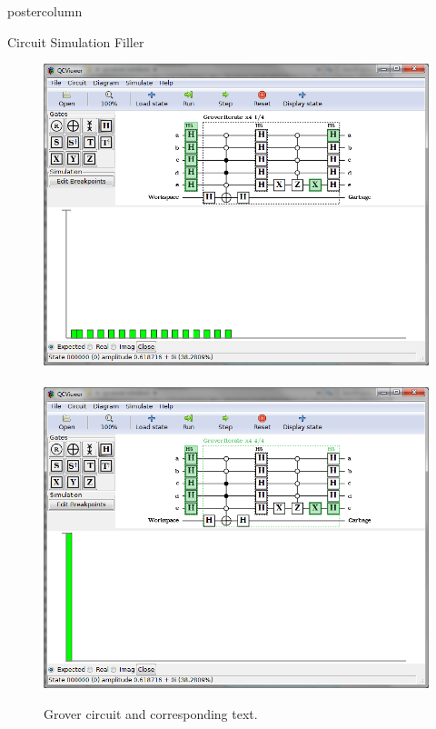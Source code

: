 \documentclass[final]{beamer} %
\begin{document}
\begin{frame}{}
\begin{columns}
\begin{column}{.33\textwidth}
\begin{beamercolorbox}[center,wd=\textwidth]{postercolumn}
\begin{minipage}[T]{.95\textwidth}
\begin{block}{\large Circuit Simulation}
	         Filler

                    \centering 
		\begin{figure}[!htbp]
		  \centering
		  \includegraphics[width=7in]{figures/Grover_Simulate1.PNG} \ \  \includegraphics[width=7in]{figures/Grover_Simulate2.PNG}
		  \caption{Grover circuit and corresponding text.}
		\end{figure}

           \end{block}


\end{minipage}
\end{beamercolorbox}
\end{column}
\end{columns}
\end{frame}
\end{document}
